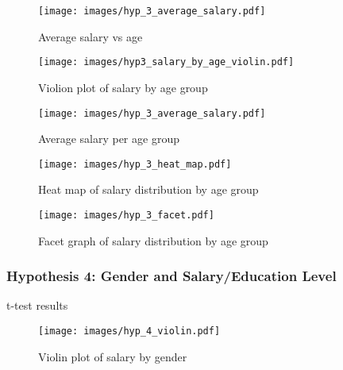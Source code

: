 \begin{figure}[H]
    \centering
    \texttt{[image: images/hyp\_3\_average\_salary.pdf]} %
    \caption{Average salary vs age}
    \label{fig:Average salary by age scatter plot}
\end{figure}

\begin{figure}[H]
    \centering
    \texttt{[image: images/hyp3\_salary\_by\_age\_violin.pdf]} %
    \caption{Violion plot of salary by age group}
    \label{fig:violion plot of salary by age group}
\end{figure}

\begin{figure}[H]
    \centering
    \texttt{[image: images/hyp\_3\_average\_salary.pdf]} %
    \caption{Average salary per age group}
    \label{fig:average salary per age group}
\end{figure}

\begin{figure}[H]
    \centering
    \texttt{[image: images/hyp\_3\_heat\_map.pdf]} %
    \caption{Heat map of salary distribution by age group}
    \label{fig:salary distribution heat map}
\end{figure}

\begin{figure}[H]
    \centering
    \texttt{[image: images/hyp\_3\_facet.pdf]} %
    \caption{Facet graph of salary distribution by age group}
    \label{fig:salary distribution facet}
\end{figure}

\subsubsection{Hypothesis 4: Gender and Salary/Education Level}

\begin{table}[H]
    \centering
    \caption{t-test results}
    \label{tab:t-test results}
    \begin{minipage}{\columnwidth}
        
    \end{minipage}
\end{table}

\begin{figure}[H]
    \centering
    \texttt{[image: images/hyp\_4\_violin.pdf]} %
    \caption{Violin plot of salary by gender}
    \label{fig:violin plot of salary by gender}
\end{figure}

